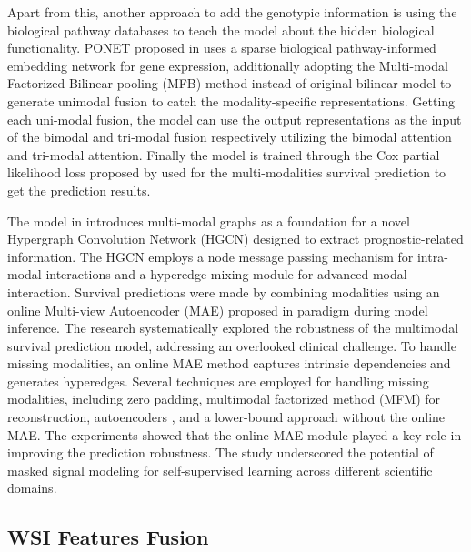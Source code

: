 \documentclass[journal,twoside,web]{ieeecolor}
\begin{document}
Apart from this, another approach to add the genotypic information is using the biological pathway databases to teach the model about the hidden biological functionality.
PONET proposed in \cite{qiu2023deep} uses a sparse biological pathway-informed embedding network for gene expression, additionally adopting the Multi-modal Factorized Bilinear pooling (MFB) method instead of original bilinear model to generate unimodal fusion to catch the modality-specific representations.
Getting each uni-modal fusion, the model can use the output representations as the input of the bimodal and tri-modal fusion respectively utilizing the bimodal attention and tri-modal attention.
Finally the model is trained through the Cox partial likelihood loss proposed by \cite{cheerla2019deep} used for the multi-modalities survival prediction to get the prediction results.

The model in \cite{hou2023hybrid} introduces multi-modal graphs as a foundation for a novel Hypergraph Convolution Network (HGCN) designed to extract prognostic-related information. 
The HGCN employs a node message passing mechanism for intra-modal interactions and a hyperedge mixing module for advanced modal interaction. 
Survival predictions were made by combining modalities using an online Multi-view Autoencoder (MAE) proposed in \cite{he2022masked} paradigm during model inference.
The research systematically explored the robustness of the multimodal survival prediction model, addressing an overlooked clinical challenge. 
To handle missing modalities, an online MAE method captures intrinsic dependencies and generates hyperedges. 
Several techniques are employed for handling missing modalities, including zero padding, multimodal factorized method (MFM) for reconstruction, autoencoders \cite{tran2017missing} \cite{liu2021incomplete}, and a lower-bound approach without the online MAE.
The experiments showed that the online MAE module played a key role in improving the prediction robustness.
The study underscored the potential of masked signal modeling for self-supervised learning across different scientific domains.




\subsection{WSI Features Fusion}
\end{document}
